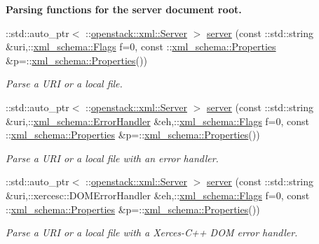 \begin{Indent}{\bf Parsing functions for the server document root.}\par
\begin{DoxyCompactItemize}
\item 
::std::auto\_\-ptr$<$ ::\hyperlink{classopenstack_1_1xml_1_1Server}{openstack::xml::Server} $>$ \hyperlink{namespaceopenstack_1_1xml_abc242fc9a6326e2b4aaaafa83f4209b2}{server} (const ::std::string \&uri,::\hyperlink{namespacexml__schema_affb4c227cbd9aa7453dd1dc5a1401943}{xml\_\-schema::Flags} f=0, const ::\hyperlink{namespacexml__schema_ad27ce19a7ee1d3b1064092648898f64c}{xml\_\-schema::Properties} \&p=::\hyperlink{namespacexml__schema_ad27ce19a7ee1d3b1064092648898f64c}{xml\_\-schema::Properties}())
\begin{DoxyCompactList}\small\item\em Parse a URI or a local file. \item\end{DoxyCompactList}\item 
::std::auto\_\-ptr$<$ ::\hyperlink{classopenstack_1_1xml_1_1Server}{openstack::xml::Server} $>$ \hyperlink{namespaceopenstack_1_1xml_a779174260ee9ff5aacc893fb732ee976}{server} (const ::std::string \&uri,::\hyperlink{namespacexml__schema_ab1c9361bfd3b404eaabf0c31eded79dc}{xml\_\-schema::ErrorHandler} \&eh,::\hyperlink{namespacexml__schema_affb4c227cbd9aa7453dd1dc5a1401943}{xml\_\-schema::Flags} f=0, const ::\hyperlink{namespacexml__schema_ad27ce19a7ee1d3b1064092648898f64c}{xml\_\-schema::Properties} \&p=::\hyperlink{namespacexml__schema_ad27ce19a7ee1d3b1064092648898f64c}{xml\_\-schema::Properties}())
\begin{DoxyCompactList}\small\item\em Parse a URI or a local file with an error handler. \item\end{DoxyCompactList}\item 
::std::auto\_\-ptr$<$ ::\hyperlink{classopenstack_1_1xml_1_1Server}{openstack::xml::Server} $>$ \hyperlink{namespaceopenstack_1_1xml_ac15885628dee063098bede1c068a82e0}{server} (const ::std::string \&uri,::xercesc::DOMErrorHandler \&eh,::\hyperlink{namespacexml__schema_affb4c227cbd9aa7453dd1dc5a1401943}{xml\_\-schema::Flags} f=0, const ::\hyperlink{namespacexml__schema_ad27ce19a7ee1d3b1064092648898f64c}{xml\_\-schema::Properties} \&p=::\hyperlink{namespacexml__schema_ad27ce19a7ee1d3b1064092648898f64c}{xml\_\-schema::Properties}())
\begin{DoxyCompactList}\small\item\em Parse a URI or a local file with a Xerces-\/C++ DOM error handler. \item\end{DoxyCompactList}\item 

\end{DoxyCompactItemize}
\end{Indent}
